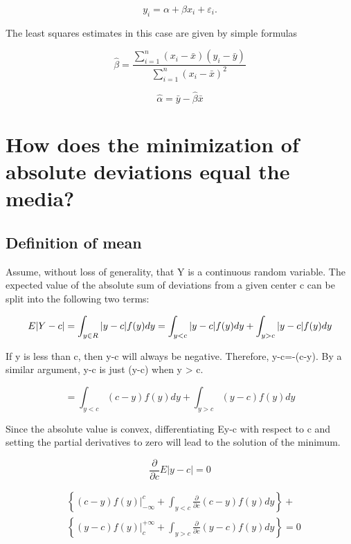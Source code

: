 \documentclass[
  letterpaper,
  DIV=11,
  numbers=noendperiod]{scrreprt}
\begin{document}
\[
y_i=\alpha+\beta x_i+\varepsilon_i .
\]

The least squares estimates in this case are given by simple formulas

\[
\widehat{\beta} =\frac{\sum_{i=1}^n\left(x_i-\bar{x}\right)\left(y_i-\bar{y}\right)}{\sum_{i=1}^n\left(x_i-\bar{x}\right)^2}
\]

\[
\widehat{\alpha} =\bar{y}-\widehat{\beta} \bar{x}
\]

\hypertarget{how-does-the-minimization-of-absolute-deviations-equal-the-media}{%
\section{How does the minimization of absolute deviations equal the
media?}\label{how-does-the-minimization-of-absolute-deviations-equal-the-media}}

\hypertarget{definition-of-mean}{%
\subsection{Definition of mean}\label{definition-of-mean}}

Assume, without loss of generality, that Y is a continuous random
variable. The expected value of the absolute sum of deviations from a
given center c can be split into the following two terms:

\[
E|Y - c| = \int_{y\in R}|y-c|f(y)dy \\
=\int_{y < c} |y-c|f(y)dy + \int_{y>c}|y-c|f(y)dy  \\
\]

If y is less than c, then y-c will always be negative. Therefore,
\textbar y-c\textbar=-(c-y). By a similar argument,
\textbar y-c\textbar{} is just (y-c) when y \textgreater{} c.

\[
=\int_{y<c}(c-y)f(y)dy + \int_{y>c}(y-c)f(y)dy
\]

Since the absolute value is convex, differentiating
E\textbar y-c\textbar{} with respect to c and setting the partial
derivatives to zero will lead to the solution of the minimum.

\[
\frac{\partial}{\partial c}E|y-c|=0
\]

\[
\begin{aligned}
& \left\{\left.(c-y) f(y)\right|_{-\infty} ^c+\int_{y<c} \frac{\partial}{\partial c}(c-y) f(y) d y\right\}+ \\
& \left\{\left.(y-c) f(y)\right|_c ^{+\infty}+\int_{y>c} \frac{\partial}{\partial c}(y-c) f(y) d y\right\}=0
\end{aligned}
\]
\end{document}
